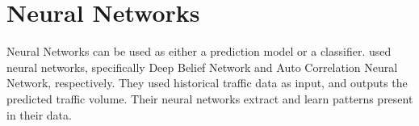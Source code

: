 




\section{Neural Networks}
Neural Networks can be used as either a prediction model or a classifier.  used neural networks, specifically Deep Belief Network and Auto Correlation Neural Network, respectively. They used historical traffic data as input, and outputs the predicted traffic volume. Their neural networks extract and learn patterns present in their data. 

